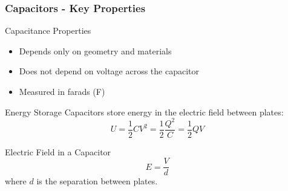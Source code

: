 \documentclass{beamer}
\begin{document}
\begin{frame}
    \frametitle{Capacitors - Key Properties}
    \begin{block}{Capacitance Properties}
        \begin{itemize}
            \item Depends only on geometry and materials
            \item Does not depend on voltage across the capacitor
            \item Measured in farads (F)
        \end{itemize}
    \end{block}
    
    \begin{block}{Energy Storage}
        Capacitors store energy in the electric field between plates:
        \begin{equation}
            U = \frac{1}{2}CV^2 = \frac{1}{2}\frac{Q^2}{C} = \frac{1}{2}QV
        \end{equation}
    \end{block}
    
    \begin{block}{Electric Field in a Capacitor}
        \begin{equation}
            E = \frac{V}{d}
        \end{equation}
        where $d$ is the separation between plates.
    \end{block}
\end{frame}
\end{document}
